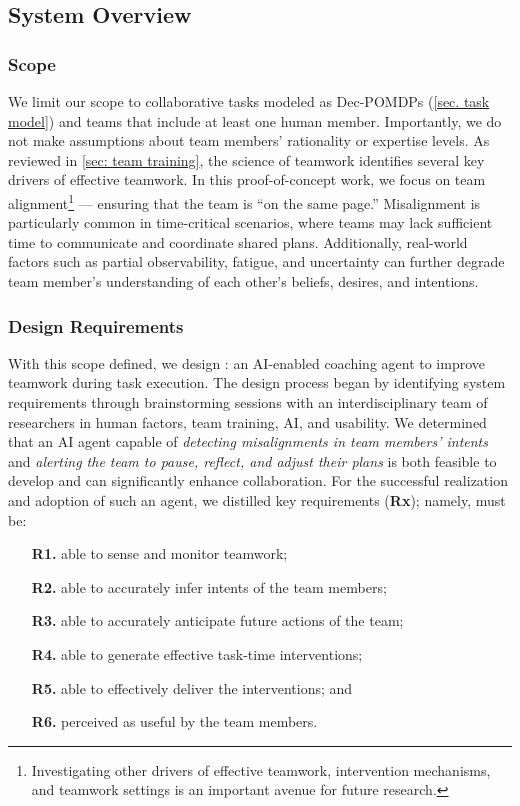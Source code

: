 \subsection{System Overview}

\subsubsection{Scope}
We limit our scope to collaborative tasks modeled as Dec-POMDPs (\cref{sec. task model}) and teams that include at least one human member.
Importantly, we do not make assumptions about team members' rationality or expertise levels.
As reviewed in \cref{sec: team training}, the science of teamwork identifies several key drivers of effective teamwork.
In this proof-of-concept work, we focus on team alignment\footnote{Investigating other drivers of effective teamwork, intervention mechanisms, and teamwork settings is an important avenue for future research.} 
 --- ensuring that the team is ``on the same page.''
Misalignment is particularly common in time-critical scenarios, where teams may lack sufficient time to communicate and coordinate shared plans.
Additionally, real-world factors such as partial observability, fatigue, and uncertainty can further degrade team member's understanding of each other's beliefs, desires, and intentions.

\subsubsection{Design Requirements}
\label{sec: problem statement}
\label{sec. requirements}
With this scope defined, we design \coach: an AI-enabled coaching agent to improve teamwork during task execution. The design process began by identifying system requirements through brainstorming sessions with an interdisciplinary team of researchers in human factors, team training, AI, and usability. We determined that an AI agent capable of \textit{detecting misalignments in team members' intents} and \textit{alerting the team to pause, reflect, and adjust their plans} is both feasible to develop and can significantly enhance collaboration.
For the successful realization and adoption of such an agent, we distilled key requirements (\textbf{Rx}); namely, \coach must be:
\begin{itemize}
    \item[\textbf{R1.}] able to sense and monitor teamwork;
    \item[\textbf{R2.}] able to accurately infer intents of the team members;
    \item[\textbf{R3.}] able to accurately anticipate future actions of the team;
    \item[\textbf{R4.}] able to generate effective task-time interventions;
    \item[\textbf{R5.}] able to effectively deliver the interventions; and
    \item[\textbf{R6.}] perceived as useful by the team members.
\end{itemize}
